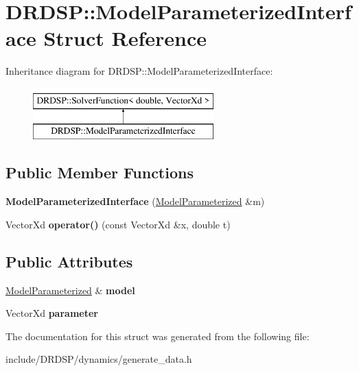 \hypertarget{struct_d_r_d_s_p_1_1_model_parameterized_interface}{\section{D\-R\-D\-S\-P\-:\-:Model\-Parameterized\-Interface Struct Reference}
\label{struct_d_r_d_s_p_1_1_model_parameterized_interface}
}
Inheritance diagram for D\-R\-D\-S\-P\-:\-:Model\-Parameterized\-Interface\-:\begin{figure}[H]
\begin{center}
\leavevmode
\includegraphics[height=2.000000cm]{struct_d_r_d_s_p_1_1_model_parameterized_interface}
\end{center}
\end{figure}
\subsection*{Public Member Functions}
\begin{DoxyCompactItemize}
\item 
\hypertarget{struct_d_r_d_s_p_1_1_model_parameterized_interface_aed86936d810d30ed09ded7c2ed0a41ab}{{\bfseries Model\-Parameterized\-Interface} (\hyperlink{struct_d_r_d_s_p_1_1_model_parameterized}{Model\-Parameterized} \&m)}\label{struct_d_r_d_s_p_1_1_model_parameterized_interface_aed86936d810d30ed09ded7c2ed0a41ab}

\item 
\hypertarget{struct_d_r_d_s_p_1_1_model_parameterized_interface_a47b0c2d5c543f54e47746022be6bad44}{Vector\-Xd {\bfseries operator()} (const Vector\-Xd \&x, double t)}\label{struct_d_r_d_s_p_1_1_model_parameterized_interface_a47b0c2d5c543f54e47746022be6bad44}

\end{DoxyCompactItemize}
\subsection*{Public Attributes}
\begin{DoxyCompactItemize}
\item 
\hypertarget{struct_d_r_d_s_p_1_1_model_parameterized_interface_a9695712adaeab9d57aa4c42936473c00}{\hyperlink{struct_d_r_d_s_p_1_1_model_parameterized}{Model\-Parameterized} \& {\bfseries model}}\label{struct_d_r_d_s_p_1_1_model_parameterized_interface_a9695712adaeab9d57aa4c42936473c00}

\item 
\hypertarget{struct_d_r_d_s_p_1_1_model_parameterized_interface_a18b50a78faedf392ad77a4cda99b01cc}{Vector\-Xd {\bfseries parameter}}\label{struct_d_r_d_s_p_1_1_model_parameterized_interface_a18b50a78faedf392ad77a4cda99b01cc}

\end{DoxyCompactItemize}


The documentation for this struct was generated from the following file\-:\begin{DoxyCompactItemize}
\item 
include/\-D\-R\-D\-S\-P/dynamics/generate\-\_\-data.\-h\end{DoxyCompactItemize}
